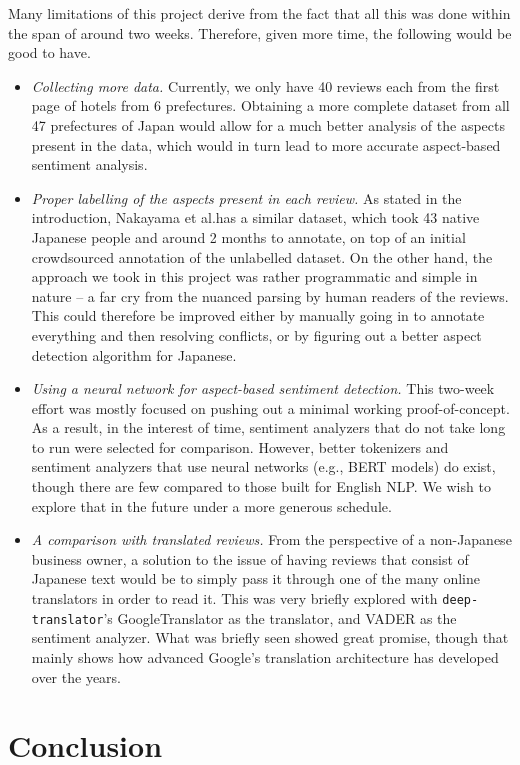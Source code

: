 \documentclass[12pt]{article}
\begin{document}
	Many limitations of this project derive from the fact that all this was done within the span of around two weeks. Therefore, given more time, the following would be good to have. \begin{itemize}
		\item \emph{Collecting more data.} Currently, we only have 40 reviews each from the first page of hotels from 6 prefectures. Obtaining a more complete dataset from all 47 prefectures of Japan would allow for a much better analysis of the aspects present in the data, which would in turn lead to more accurate aspect-based sentiment analysis.
		\item \emph{Proper labelling of the aspects present in each review.} As stated in the introduction, Nakayama et al.\@ has a similar dataset, which took 43 native Japanese people and around 2 months to annotate, on top of an initial crowdsourced annotation of the unlabelled dataset. On the other hand, the approach we took in this project was rather programmatic and simple in nature -- a far cry from the nuanced parsing by human readers of the reviews. This could therefore be improved either by manually going in to annotate everything and then resolving conflicts, or by figuring out a better aspect detection algorithm for Japanese.
		\item \emph{Using a neural network for aspect-based sentiment detection.} This two-week effort was mostly focused on pushing out a minimal working proof-of-concept. As a result, in the interest of time, sentiment analyzers that do not take long to run were selected for comparison. However, better tokenizers and sentiment analyzers that use neural networks (e.g., BERT models) do exist, though there are few compared to those built for English NLP. We wish to explore that in the future under a more generous schedule.
		\item \emph{A comparison with translated reviews.} From the perspective of a non-Japanese business owner, a solution to the issue of having reviews that consist of Japanese text would be to simply pass it through one of the many online translators in order to read it. This was very briefly explored with \verb*|deep-translator|'s GoogleTranslator as the translator, and VADER as the sentiment analyzer. What was briefly seen showed great promise, though that mainly shows how advanced Google's translation architecture has developed over the years.
	\end{itemize}
	
	\section{Conclusion}
	
\end{document}
